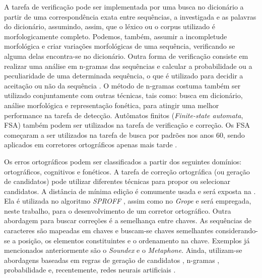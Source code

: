 \documentclass{textolivre}
\begin{document}
A tarefa de verificação pode ser implementada por uma busca no dicionário
a partir de uma correspondência exata entre sequências, a investigada e as palavras do dicionário, assumindo, assim, que o léxico ou o corpus 
utilizado é morfologicamente completo.
Podemos, também, assumir a incompletude morfológica e criar variações morfológicas de uma sequência, verificando se alguma delas encontra-se no dicionário.
Outra forma de verificação consiste em realizar uma análise em n-gramas das sequências e calcular  
a probabilidade ou a peculiaridade de uma determinada sequência, o que é utilizado para decidir
a aceitação ou não da sequência \cite{peterson80,zamora1981}.  
O método de n-gramas costuma também ser utilizado conjuntamente 
com outras técnicas, tais como: busca em dicionário, análise morfológica e representação fonética, para
atingir uma melhor performance na tarefa de detecção.
Autômatos finitos (\textit{Finite-state automata}, FSA) também podem ser utilizados na tarefa de verificação e correção. 
Os FSA começaram a ser utilizados na tarefa de busca por padrões nos anos 60, 
sendo aplicados em corretores ortográficos apenas mais tarde \cite{lucchesi1993,oflazer1994,oflazer96}.

Os erros ortográficos podem ser classificados a partir dos seguintes domínios: ortográficos, cognitivos e fonéticos.
A tarefa de correção ortográfica (ou geração de candidatos) 
pode utilizar diferentes técnicas para propor ou selecionar candidatos.
A distância de mínima edição é comumente usada e será exposta na .
Ela é utilizada no algoritmo \textit{SPROFF} \cite{dunlavey1981}, assim como no \textit{Grope} 
e será empregada, neste trabalho, para o desenvolvimento de um corretor ortográfico.
Outra abordagem para buscar correções é a semelhança entre chaves. As sequências de caracteres
são mapeadas em chaves e buscam-se chaves semelhantes considerando-se a posição, os elementos constituintes e o ordenamento na chave.
Exemplos já mencionados anteriormente são o \textit{Soundex} e o \textit{Metaphone}.
Ainda, utilizam-se abordagens baseadas em regras de geração de candidatos \cite{yannakoudakis1983,yannakoudakis1983b}, 
n-gramas \cite{kim1992,kim1994}, probabilidade \cite{kernighan1990,jurafsky2008,ingels1996} e, recentemente,
redes neurais artificiais \cite{deffner1990,hodge2002,hodge2003,yunus2020}.
\end{document}
